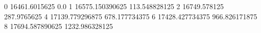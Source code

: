 0 16461.6015625 0.0
1 16575.150390625 113.548828125
2 16749.578125 287.9765625
4 17139.779296875 678.177734375
6 17428.427734375 966.826171875
8 17694.587890625 1232.986328125
